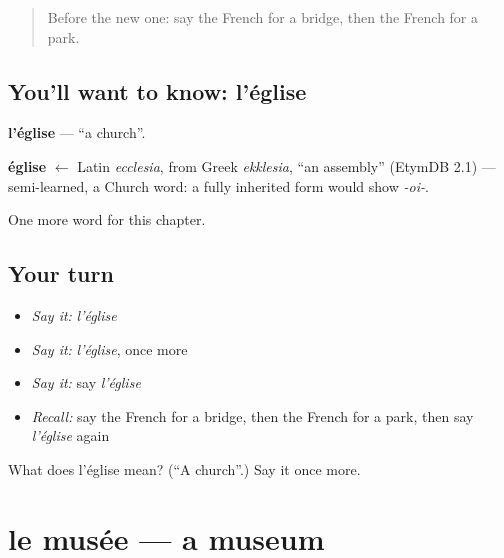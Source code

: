 \label{lesson:FR-C100-eglise}



\begin{quote}
Before the new one: say the French for a bridge, then the French for a park.
\end{quote}

\subsection*{You'll want to know: l'église}
\textbf{l'église} — \textquotedblleft{}a church\textquotedblright{}.

\begin{cousinweb}
\textbf{église} $\leftarrow$ Latin \emph{ecclesia}, from Greek \emph{ekklesia}, \textquotedblleft{}an assembly\textquotedblright{} (EtymDB 2.1) — semi-learned, a Church word: a fully inherited form would show \emph{-oi-}.
\end{cousinweb}

\begin{grammarlens}[title={What you've built}]
One more word for this chapter.
\end{grammarlens}

\subsection*{Your turn}
\begin{itemize}
\raggedright
  \item \emph{Say it:} \emph{l'église}
  \item \emph{Say it:} \emph{l'église}, once more
  \item \emph{Say it:} say \emph{l'église}
  \item \emph{Recall:} say the French for a bridge, then the French for a park, then say \emph{l'église} again
\end{itemize}

\begin{tcolorbox}[breakable,colback=teal!4,colframe=teal!35!black,title={Before you move on}]
What does l'église mean? (\textquotedblleft{}A church\textquotedblright{}.) Say it once more.
\end{tcolorbox}
\section[le musée]{le musée — a museum}

\label{lesson:FR-C100-musee}




